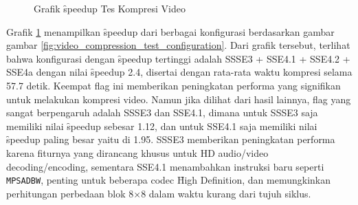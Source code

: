 \begin{figure}
    \centering
    \caption{Grafik \f{speedup} Tes Kompresi Video}
    \label{fig:video_compression_test_graph}
\end{figure}

Grafik \ref{fig:video_compression_test_graph} menampilkan \f{speedup} dari berbagai konfigurasi berdasarkan gambar gambar \ref{fig:video_compression_test_configuration}. Dari grafik tersebut, terlihat bahwa konfigurasi dengan \f{speedup} tertinggi adalah SSSE3 + SSE4.1 + SSE4.2 + SSE4a dengan nilai \f{speedup} 2.4, disertai dengan rata-rata waktu kompresi selama 57.7 detik. Keempat flag ini memberikan peningkatan performa yang signifikan untuk melakukan kompresi video. Namun jika dilihat dari hasil lainnya, flag yang sangat berpengaruh adalah SSSE3 dan SSE4.1, dimana untuk SSSE3 saja memiliki nilai \f{speedup} sebesar 1.12, dan untuk SSE4.1 saja memiliki nilai \f{speedup} paling besar yaitu di 1.95. SSSE3 memberikan peningkatan performa karena fiturnya yang dirancang khusus untuk HD audio/video decoding/encoding, sementara SSE4.1 menambahkan instruksi baru seperti \texttt{MPSADBW}, penting untuk beberapa codec \f{High Definition}, dan memungkinkan perhitungan perbedaan blok 8×8 dalam waktu kurang dari tujuh siklus.

